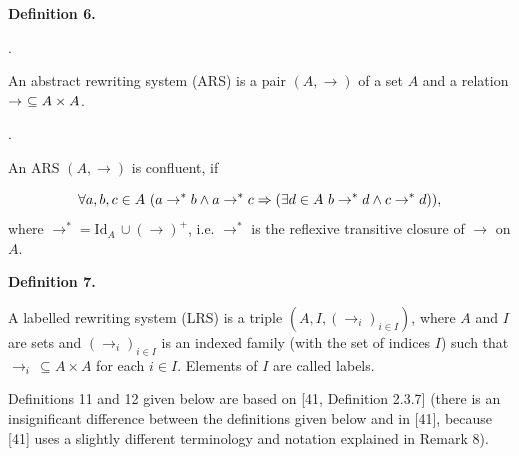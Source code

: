  
 
\par\medskip\noindent\textbf{Definition 6.}\par
 
  
\par{}. 
 
An abstract rewriting system (ARS) is a pair $(A,\to)$ of a set $A$ and a relation $\to\leavevmode\nobreak\ \subseteq A\times A$.\par
 
 
 
\par{}. 
 
An ARS $(A,\to)$ is confluent, if\par
    \[\forall a,b,c\in A\leavevmode\nobreak\ (a\to^{*}b\wedge a\to^{*}c\Rightarrow(%
\exists d\in A\leavevmode\nobreak\ b\to^{*}d\wedge c\to^{*}d)),\]    
where $\to^{*}=\mathrm{Id}_{A}\,\cup(\to)^{+}$, i.e. $\to^{*}$ is the reflexive transitive closure of $\to$ on $A$.\par
 
 
  
 
 
 
\par\medskip\noindent\textbf{Definition 7.}\par
 
 
A labelled rewriting system (LRS) is a triple $(A,I,(\to_{i})_{i\in I})$, where $A$ and $I$ are sets and $(\to_{i})_{i\in I}$ is an indexed family (with the set of indices $I$) such that $\to_{i}\,\subseteq A\times A$ for each $i\in I$. Elements of $I$ are called labels.\par
 
 
 
 
Definitions 11 and 12 given below are based on [41, Definition 2.3.7] (there is an insignificant difference between the definitions given below and in [41], because [41] uses a slightly different terminology and notation explained in Remark 8).\par
 
